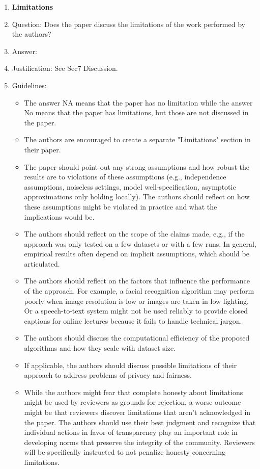 \documentclass{article}
\begin{document}
\begin{enumerate}
\item {\bf Limitations}
    \item[] Question: Does the paper discuss the limitations of the work performed by the authors?
    \item[] Answer: \answerYes{} %
    \item[] Justification: See Sec7 Discussion.
    \item[] Guidelines:
    \begin{itemize}
        \item The answer NA means that the paper has no limitation while the answer No means that the paper has limitations, but those are not discussed in the paper. 
        \item The authors are encouraged to create a separate "Limitations" section in their paper.
        \item The paper should point out any strong assumptions and how robust the results are to violations of these assumptions (e.g., independence assumptions, noiseless settings, model well-specification, asymptotic approximations only holding locally). The authors should reflect on how these assumptions might be violated in practice and what the implications would be.
        \item The authors should reflect on the scope of the claims made, e.g., if the approach was only tested on a few datasets or with a few runs. In general, empirical results often depend on implicit assumptions, which should be articulated.
        \item The authors should reflect on the factors that influence the performance of the approach. For example, a facial recognition algorithm may perform poorly when image resolution is low or images are taken in low lighting. Or a speech-to-text system might not be used reliably to provide closed captions for online lectures because it fails to handle technical jargon.
        \item The authors should discuss the computational efficiency of the proposed algorithms and how they scale with dataset size.
        \item If applicable, the authors should discuss possible limitations of their approach to address problems of privacy and fairness.
        \item While the authors might fear that complete honesty about limitations might be used by reviewers as grounds for rejection, a worse outcome might be that reviewers discover limitations that aren't acknowledged in the paper. The authors should use their best judgment and recognize that individual actions in favor of transparency play an important role in developing norms that preserve the integrity of the community. Reviewers will be specifically instructed to not penalize honesty concerning limitations.
    \end{itemize}


\end{enumerate}
\end{document}
